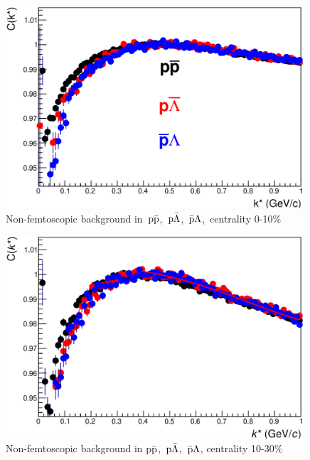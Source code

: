 \documentclass[ALICE,manyauthors]{ALICE_analysis_notes}
\newcommand{\pap}{$\rm p\bar{\rm p}$}
\newcommand{\pal}{$\rm p\bar{\rm \Lambda}$}
\newcommand{\apl}{$\bar{\rm p }\Lambda$}
\begin{document}
\begin{figure}[]
   \centering
   \includegraphics[width=0.99\textwidth]{pics/compBack010}
   \caption{ Non-femtoscopic background in~\pap,~\pal,~\apl,~centrality 0-10$\%$}
   \label{fig:backCorrFun010}
 \end{figure}

\begin{figure}[]
   \centering
   \includegraphics[width=0.99\textwidth]{pics/compBack1030}
   \caption{ Non-femtoscopic background in \pap,~\pal,~\apl, centrality 10-30$\%$}
   \label{fig:backCorrFun1030}
 \end{figure}
\end{document}
